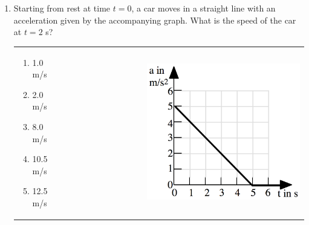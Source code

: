 \documentclass[12pt,letterpaper]{article}
\begin{document}
\begin{enumerate}

\item
Starting from rest at time $t = 0$, a car moves in a straight line with an acceleration given by the accompanying graph. What is the speed of the car at $t = 2$ s?

\begin{tabular}{l r}

\begin{minipage}{0.575\textwidth}
\begin{enumerate}
\item 1.0 m/s
\item 2.0 m/s
\item 8.0 m/s
\item 10.5 m/s
\item 12.5 m/s
\end{enumerate}
\end{minipage} &
\begin{minipage}{0.4\textwidth}
\includegraphics[width=0.65\textwidth,center]{agraph.png}
\end{minipage}
\end{tabular}
\end{enumerate}
\end{document}
